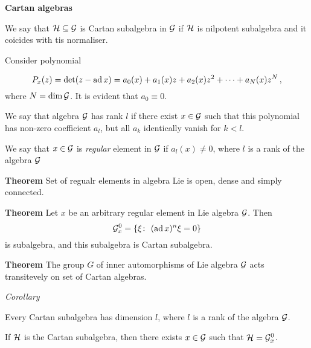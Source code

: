 
\def\e{{\bf e}}
\def\f{{\bf f}}
\def\y{{\bf y}}

\def\G {{\cal G}}
\def\H {{\cal H}}
\def\ad {{\rm ad\,}}
\def\m {\medskip}

       \centerline {\bf Cartan algebras}

  We say that $\H\subseteq \G$ is Cartan subalgebra in $\G$
if $\H$ is nilpotent subalgebra and it coicides with tis normaliser.

  Consider polynomial 

          $$
     P_x(z)=\det (z-\ad x)=a_0(x)+a_1(x)z+a_2(x)z^2+\dots+a_N(x)z^N\,,
           $$
where $N={\rm dim\,}\G$. It is evident that $a_0\equiv 0$.

\m


   We say that algebra $\G$ has rank $l$ if
   there exist $x\in \G$ such that
this polynomial has non-zero coefficient $a_l$,
but all $a_k$ identically vanish for $k<l$.

\m

   We say that $x\in \G$ is {\it regular} element in $\G$
if $a_l(x)\not=0$, where $l$ is a rank of the algebra $\G$


\m

    {\bf Theorem}  Set of regualr elements in algebra Lie is
open, dense and simply connected.


  \m 

  {\bf Theorem}  Let $x$ be an arbitrary regular element in Lie algebra
$\G$. Then  
        $$
\G_x^0=\{\xi\colon\,\, (\ad x)^n\xi=0\}
        $$ 
is subalgebra, and this subalgebra is Cartan subalgebra.

\m

    {\bf Theorem} The group $G$ of inner automorphisms of Lie algebra
   $\G$ acts transitevely on set of Cartan algebras.

\m

   {\sl Corollary}

   Every Cartan subalgebra has dimension $l$, where $l$ is a rank 
of the algebra $\G$. 

          If $\H$ is the Cartan subalgebra, then there exists $x\in \G$
such that $\H=\G_x^0$.




\bye
